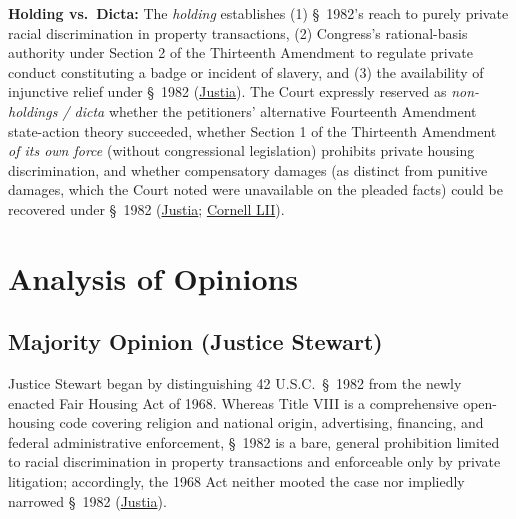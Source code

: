 \documentclass[12pt]{article}
\begin{document}
\textbf{Holding vs.\ Dicta:} The \emph{holding} establishes (1) \S~1982's reach to purely private racial discrimination in property transactions, (2) Congress's rational-basis authority under Section 2 of the Thirteenth Amendment to regulate private conduct constituting a badge or incident of slavery, and (3) the availability of injunctive relief under \S~1982 (\href{https://supreme.justia.com/cases/federal/us/392/409/}{Justia}). The Court expressly reserved as \emph{non-holdings / dicta} whether the petitioners' alternative Fourteenth Amendment state-action theory succeeded, whether Section 1 of the Thirteenth Amendment \emph{of its own force} (without congressional legislation) prohibits private housing discrimination, and whether compensatory damages (as distinct from punitive damages, which the Court noted were unavailable on the pleaded facts) could be recovered under \S~1982 (\href{https://supreme.justia.com/cases/federal/us/392/409/}{Justia}; \href{https://www.law.cornell.edu/constitution-conan/amendment-13/scope-of-enforcement-clause-of-thirteenth-amendment}{Cornell LII}).

\section{Analysis of Opinions}

\subsection{Majority Opinion (Justice Stewart)}

Justice Stewart began by distinguishing 42 U.S.C.\ \S~1982 from the newly enacted Fair Housing Act of 1968. Whereas Title VIII is a comprehensive open-housing code covering religion and national origin, advertising, financing, and federal administrative enforcement, \S~1982 is a bare, general prohibition limited to racial discrimination in property transactions and enforceable only by private litigation; accordingly, the 1968 Act neither mooted the case nor impliedly narrowed \S~1982 (\href{https://supreme.justia.com/cases/federal/us/392/409/}{Justia}).
\end{document}

